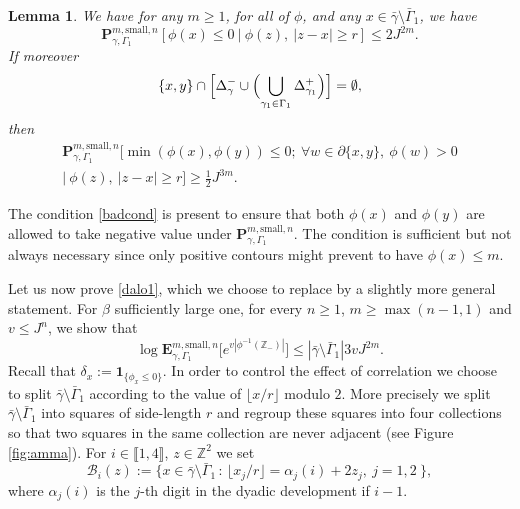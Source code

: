 \documentclass[10pt]{amsart}
\let\mathcal\mathscr
\newcommand{\sep}{\,:\,}
\numberwithin{equation}{section}
\theoremstyle{plain}
\newtheorem{lemma}[theorem]{Lemma}
\theoremstyle{definition}
\newcommand{\sm}{\mathrm{small}}
\newcommand{\lint}{\llbracket}
\newcommand{\rint}{\rrbracket}
\newcommand{\ind}{\mathbf{1}}
\newcommand{\cB}{{\ensuremath{\mathcal B}} }
\newcommand{\bP}{{\ensuremath{\mathbf P}} }
\newcommand{\bE}{{\ensuremath{\mathbf E}} }
\newcommand{\bbZ}{{\ensuremath{\mathbb Z}} }
\newcommand{\gb}{\beta}
\newcommand{\gG}{\Gamma}
\begin{document}
\begin{lemma}\label{locall}
We have for any $m\ge 1$, for all of $\phi$, and any $x\in\bar \gamma \setminus \bar \gG_1$, we have\vspace*{-3pt}
\begin{equation*}%
\bP^{m,\sm,n}_{\gamma,\gG_1}[\phi(x)\le 0\ | \ \phi(z),\ |z-x|\ge r]\le 2 J^{2m}.
\end{equation*}
If moreover\vspace*{-3pt}
\begin{equation}\label{badcond}
\{x,y\}\cap \Bigl[\Delta^-_{\gamma}\cup \Bigl(\bigcup_{\gamma_1\in \gG_1} \Delta^+_{\gamma_1}\Bigr) \Bigr]=\emptyset,\vspace*{-3pt}
\end{equation}
then\vspace*{-3pt}
\begin{multline*}%
\bP^{m,\sm,n}_{\gamma,\gG_1}\big[\min(\phi(x),\phi(y))\le 0; \ \forall w\in \partial \{x,y\}, \ \phi(w)>0 \\[-3pt]
| \ \phi(z),\ |z-x|\ge r\big]\ge \frac{1}{2} J^{3m}.
\end{multline*}
\end{lemma}
The condition \eqref{badcond} is present to ensure that both $\phi(x)$ and $\phi(y)$ are allowed to take negative value under
$\bP^{m,\sm,n}_{\gamma,\gG_1}$. The condition is sufficient but not always necessary since only positive contours might prevent to have $\phi(x)\le m$.

Let us now prove \eqref{dalo1}, which we choose to replace by a slightly more general statement. For $\gb$ sufficiently large one, for every $n\ge 1$,
$m\ge \max(n-1,1)$ and $v\le J^n$, we show that%
\begin{equation}\label{lecarlat}
\log \bE^{m,\sm,n}_{\gamma,\gG_1}\bigl[ e^{v |\phi^{-1}(\bbZ_-)|} \bigr] \le |\bar \gamma\setminus \bar \gG_1|3 v J^{2m}.
\end{equation}
Recall that $\delta_x:=\ind_{\{\phi_x\le 0\}}$.
In order to control the effect of correlation we choose to split $\bar \gamma \setminus \bar \gG_1$
according to the value of $\lfloor x/r \rfloor$ modulo $2$.
More precisely we split $\bar \gamma \setminus \bar \gG_1$ into squares of side-length $r$ and regroup these squares into four collections so that two squares in the same collection are never adjacent (see Figure \ref{fig:amma}).
For $i \in \lint 1, 4\rint$, $z\in\bbZ^2$ we set
\begin{equation}
\label{ztook}
\cB_i(z):=\{ x\in \bar \gamma \setminus \bar \gG_1 \sep \lfloor x_j/r \rfloor=\alpha_j(i)+2z_j,\ j=1,2\ \},
\end{equation}
where $\alpha_j(i)$ is the $j$-th digit in the dyadic development if $i-1$.
\end{document}
